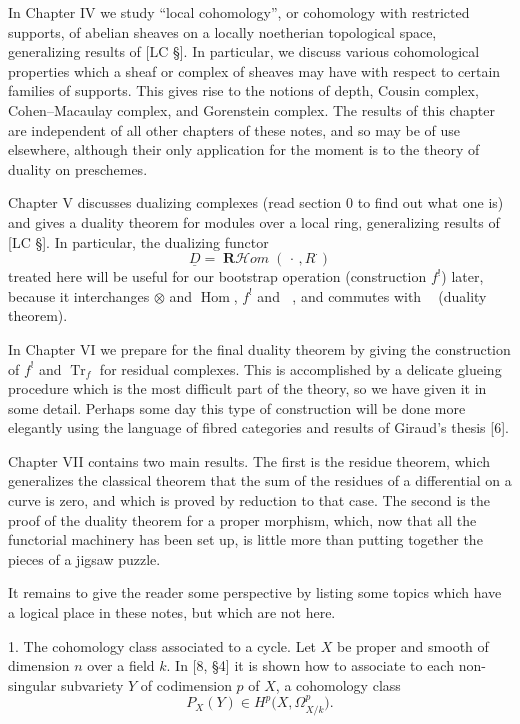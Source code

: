 \documentclass[12pt]{book}
\DeclareMathOperator{\Hom}{Hom}
\DeclareMathOperator{\Rfst}{\mathbf{R}f_*}
\DeclareMathOperator{\Lfst}{\mathbf{L}f_*}
\DeclareMathOperator{\RHom}{\mathbf{R}\mathcal{H}\textit{om}}
\begin{document}
\setcounter{page}{16}

In Chapter IV we study ``local cohomology'', or cohomology with restricted supports, of abelian sheaves on a locally noetherian topological space, generalizing results of [LC \S]. In particular, we discuss various cohomological properties which a sheaf or complex of sheaves may have with respect to certain families of supports. This gives rise to the notions of depth, Cousin complex, Cohen--Macaulay complex, and Gorenstein complex. The results of this chapter are independent of all other chapters of these notes, and so may be of use elsewhere, although their only application for the moment is to the theory of duality on preschemes.

Chapter V discusses dualizing complexes (read section 0 to find out what one is) and gives a duality theorem for modules over a local ring, generalizing results of [LC \S]. In particular, the dualizing functor
\[
\underline{D} = \RHom(\,\cdot\,, R^\cdot)
\]
treated here will be useful for our bootstrap operation (construction \(f^{!}\)) later, because it interchanges \(\otimes\) and \(\Hom\), \(f^{!}\) and \(\Lfst\), and commutes with \(\Rfst\) (duality theorem).

In Chapter VI we prepare for the final duality theorem by giving the construction of \(f^{!}\) and \(\operatorname{Tr}_{f}\) for residual complexes.
This is accomplished by a delicate glueing procedure which is the most difficult part of the theory, so we have given it in some detail. Perhaps some day this type of construction will be done more elegantly using the language of fibred categories and results of Giraud's thesis [6].

\setcounter{page}{17}

Chapter VII contains two main results. The first is the residue theorem, which generalizes the classical theorem that the sum of the residues of a differential on a curve is zero, and which is proved by reduction to that case. The second is the proof of the duality theorem for a proper morphism, which, now that all the functorial machinery has been set up, is little more than putting together the pieces of a jigsaw puzzle.

It remains to give the reader some perspective by listing some topics which have a logical place in these notes, but which are not here.

1. The cohomology class associated to a cycle. Let \(X\) be proper and smooth of dimension \(n\) over a field \(k\). In [8, \S4] it is shown how to associate to each non-singular subvariety \(Y\) of codimension \(p\) of \(X\), a cohomology class
\[
P_{X}(Y) \in H^{p}\bigl(X,\Omega_{X/k}^{p}\bigr).
\]
\end{document}
